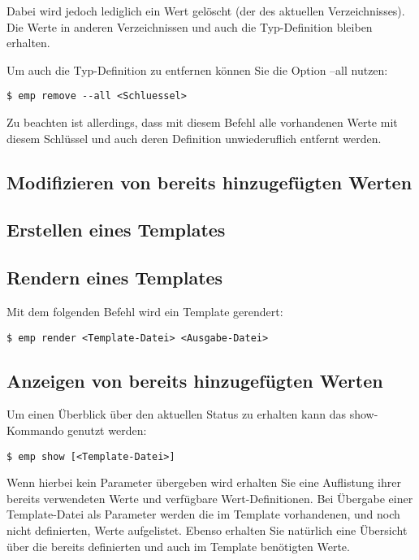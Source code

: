 Dabei wird jedoch lediglich ein Wert gelöscht (der des aktuellen Verzeichnisses). Die Werte in anderen Verzeichnissen und auch die Typ-Definition bleiben erhalten.

Um auch die Typ-Definition zu entfernen können Sie die Option --all nutzen:
\begin{lstlisting}[style=Bash]
$ emp remove --all <Schluessel>
\end{lstlisting}
Zu beachten ist allerdings, dass mit diesem Befehl alle vorhandenen Werte mit diesem Schlüssel und auch deren Definition unwiederuflich entfernt werden.

\subsection{Modifizieren von bereits hinzugefügten Werten}
\subsection{Erstellen eines Templates}
\subsection{Rendern eines Templates}
Mit dem folgenden Befehl wird ein Template gerendert:
\begin{lstlisting}[style=Bash]
$ emp render <Template-Datei> <Ausgabe-Datei>
\end{lstlisting}

\subsection{Anzeigen von bereits hinzugefügten Werten}
Um einen Überblick über den aktuellen Status zu erhalten kann das show-Kommando genutzt werden:
\begin{lstlisting}[style=Bash]
$ emp show [<Template-Datei>]
\end{lstlisting}
Wenn hierbei kein Parameter übergeben wird erhalten Sie eine Auflistung ihrer bereits verwendeten Werte und verfügbare Wert-Definitionen.
Bei Übergabe einer Template-Datei als Parameter werden die im Template vorhandenen, und noch nicht definierten, Werte aufgelistet. Ebenso erhalten Sie natürlich eine Übersicht über die bereits definierten und auch im Template benötigten Werte.
